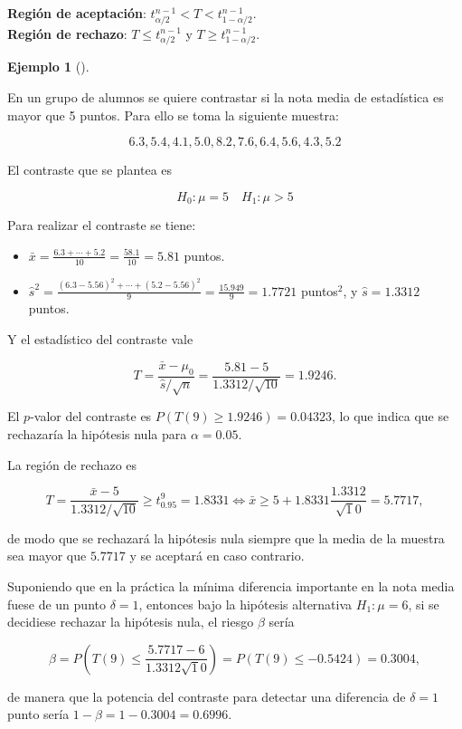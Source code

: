 \documentclass[
  a4paper,
]{scrreport}
\providecommand{\tightlist}{%
  \setlength{\itemsep}{0pt}\setlength{\parskip}{0pt}}\usepackage{longtable,booktabs,array}
\theoremstyle{definition}
\theoremstyle{definition}
\newtheorem{example}{Ejemplo}[chapter]
\theoremstyle{plain}
\theoremstyle{remark}
\begin{document}
\textbf{Región de aceptación}:
\(t^{n-1}_{\alpha/2} < T < t^{n-1}_{1-\alpha/2}\).\\
\textbf{Región de rechazo}: \(T\leq t^{n-1}_{\alpha/2}\) y
\(T\geq t^{n-1}_{1-\alpha/2}\).

\begin{example}[]\protect\hypertarget{exm-contraste-media-normal-varianza-desconocida}{}\label{exm-contraste-media-normal-varianza-desconocida}

En un grupo de alumnos se quiere contrastar si la nota media de
estadística es mayor que 5 puntos. Para ello se toma la siguiente
muestra:

\[
6.3, 5.4, 4.1, 5.0, 8.2, 7.6, 6.4, 5.6, 4.3, 5.2
\]

El contraste que se plantea es

\[H_0: \mu=5 \quad H_1: \mu>5\]

Para realizar el contraste se tiene:

\begin{itemize}
\tightlist
\item
  \(\bar x = \frac{6.3+\cdots+5.2}{10}=\frac{58.1}{10}=5.81\) puntos.
\item
  \(\hat s^2 = \frac{(6.3-5.56)^2+\cdots+(5.2-5.56)^2}{9} = \frac{15.949}{9}=1.7721\)
  puntos\(^2\), y \(\hat s=1.3312\) puntos.
\end{itemize}

Y el estadístico del contraste vale

\[
T=\frac{\bar x-\mu_0}{\hat s/\sqrt{n}} = \frac{5.81-5}{1.3312/\sqrt{10}}= 1.9246.
\]

El \(p\)-valor del contraste es \(P(T(9)\geq 1.9246) = 0.04323\), lo que
indica que se rechazaría la hipótesis nula para \(\alpha=0.05\).

La región de rechazo es

\[
T=\frac{\bar x-5}{1.3312/\sqrt{10}} \geq t^9_{0.95} = 1.8331 \Leftrightarrow \bar x \geq 5+1.8331\frac{1.3312}{\sqrt
10} = 5.7717,
\]

de modo que se rechazará la hipótesis nula siempre que la media de la
muestra sea mayor que \(5.7717\) y se aceptará en caso contrario.

Suponiendo que en la práctica la mínima diferencia importante en la nota
media fuese de un punto \(\delta=1\), entonces bajo la hipótesis
alternativa \(H_1:\mu=6\), si se decidiese rechazar la hipótesis nula,
el riesgo \(\beta\) sería

\[
\beta = P\left(T(9)\leq \frac{5.7717-6}{1.3312\sqrt 10}\right) = P(T(9)\leq -0.5424) = 0.3004,
\]

de manera que la potencia del contraste para detectar una diferencia de
\(\delta=1\) punto sería \(1-\beta=1-0.3004 = 0.6996\).

\end{example}
\end{document}
